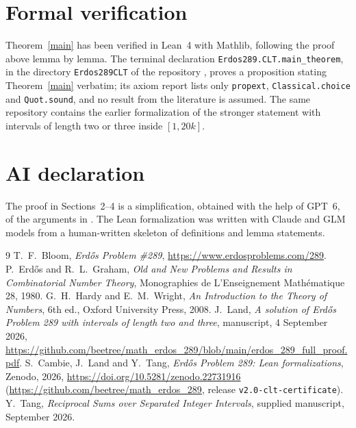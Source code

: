 \documentclass[11pt]{article}
\begin{document}
\section{Formal verification}\label{sec:formal}

Theorem~\ref{main} has been verified in Lean~4 with Mathlib, following the
proof above lemma by lemma. The terminal declaration
\texttt{Erdos289.CLT.main\_theorem}, in the directory \texttt{Erdos289CLT} of
the repository \cite{Repo}, proves a proposition stating Theorem~\ref{main}
verbatim; its axiom report lists only \texttt{propext},
\texttt{Classical.choice} and \texttt{Quot.sound}, and no result from the
literature is assumed. The same repository contains the earlier formalization
\cite{Land} of the stronger statement with intervals of length two or three
inside $[1,20k]$.



\section*{AI declaration}

The proof in Sections~2--4 is a simplification, obtained with the help of GPT~6, of the
arguments in \cite{Land,Tang}. The Lean formalization was written with Claude
and GLM models from a human-written skeleton of definitions and lemma
statements.

\begin{thebibliography}{9}
T.~F.~Bloom,
\emph{Erd\H{o}s Problem \#289},
\url{https://www.erdosproblems.com/289}.
 P.~Erd\H{o}s and R.~L.~Graham,
\emph{Old and New Problems and Results in Combinatorial Number Theory},
Monographies de L'Enseignement Math\'ematique 28, 1980.
 G.~H.~Hardy and E.~M.~Wright,
\emph{An Introduction to the Theory of Numbers}, 6th ed.,
Oxford University Press, 2008.
 J.~Land,
\emph{A solution of Erd\H{o}s Problem 289 with intervals of length two and three},
manuscript, 4 September 2026,
\url{https://github.com/beetree/math_erdos_289/blob/main/erdos_289_full_proof.pdf}.
 S.~Cambie, J.~Land and Y.~Tang,
\emph{Erd\H{o}s Problem 289: Lean formalizations},
Zenodo, 2026, \url{https://doi.org/10.5281/zenodo.22731916}
(\url{https://github.com/beetree/math_erdos_289}, release \texttt{v2.0-clt-certificate}).
 Y.~Tang,
\emph{Reciprocal Sums over Separated Integer Intervals},
supplied manuscript, September 2026.
\end{thebibliography}
\end{document}
